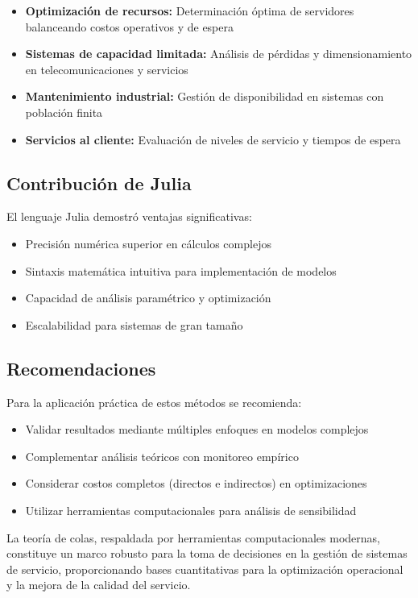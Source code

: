 \documentclass[12pt, a4paper, oneside]{book}
\theoremstyle{definition}
\begin{document}
\begin{center}
\begin{center}
\begin{center}
\begin{itemize}
\item \textbf{Optimización de recursos:} Determinación óptima de servidores balanceando costos operativos y de espera
\item \textbf{Sistemas de capacidad limitada:} Análisis de pérdidas y dimensionamiento en telecomunicaciones y servicios
\item \textbf{Mantenimiento industrial:} Gestión de disponibilidad en sistemas con población finita
\item \textbf{Servicios al cliente:} Evaluación de niveles de servicio y tiempos de espera
\end{itemize}

\subsection{Contribución de Julia}

El lenguaje Julia demostró ventajas significativas:

\begin{itemize}
\item Precisión numérica superior en cálculos complejos
\item Sintaxis matemática intuitiva para implementación de modelos
\item Capacidad de análisis paramétrico y optimización
\item Escalabilidad para sistemas de gran tamaño
\end{itemize}

\subsection{Recomendaciones}

Para la aplicación práctica de estos métodos se recomienda:

\begin{itemize}
\item Validar resultados mediante múltiples enfoques en modelos complejos
\item Complementar análisis teóricos con monitoreo empírico
\item Considerar costos completos (directos e indirectos) en optimizaciones
\item Utilizar herramientas computacionales para análisis de sensibilidad
\end{itemize}

La teoría de colas, respaldada por herramientas computacionales modernas, constituye un marco robusto para la toma de decisiones en la gestión de sistemas de servicio, proporcionando bases cuantitativas para la optimización operacional y la mejora de la calidad del servicio.


\end{center}
\end{center}
\end{center}
\end{document}
